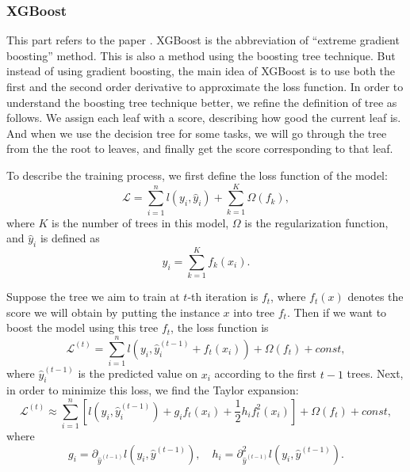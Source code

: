 \documentclass[english]{article}
\begin{document}
\subsubsection{XGBoost}
\par This part refers to the paper \cite{chen1603xgboost}. XGBoost is the abbreviation of ``extreme gradient boosting'' method. This is also a method using the boosting tree technique. But instead of using gradient boosting, the main idea of XGBoost is to use both the first and the second order derivative to approximate the loss function. In order to understand the boosting tree technique better, we refine the definition of tree as follows. We assign each leaf with a score, describing how good the current leaf is. And when we use the decision tree for some tasks, we will go through the tree from the the root to leaves, and finally get the score corresponding to that leaf.
\par To describe the training process, we first define the loss function of the model:
\begin{equation}
	\mathcal{L} = \sum_{i=1}^{n}l(y_{i}, \hat{y}_{i}) + \sum_{k=1}^{K}\Omega(f_{k}),
\end{equation}
where $K$ is the number of trees in this model, $\Omega$ is the regularization function, and $\hat{y}_{i}$ is defined as
\begin{equation}
	\hat{y}_{i} = \sum_{k=1}^{K}f_{k}(x_{i}).
\end{equation}
\par Suppose the tree we aim to train at $t$-th iteration is $f_{t}$, where $f_{t}(x)$ denotes the score we will obtain by putting the instance $x$ into tree $f_{t}$. Then if we want to boost the model using this tree $f_{t}$, the loss function is 
\begin{equation}
	\mathcal{L}^{(t)} = \sum_{i=1}^{n}l(y_{i}, \hat{y}_{i}^{(t-1)} + f_{t}(x_{i})) + \Omega(f_{t}) + const,
\end{equation}
where $\hat{y}_{i}^{(t-1)}$ is the predicted value on $x_{i}$ according to the first $t-1$ trees. Next, in order to minimize this loss, we find the Taylor expansion:
\begin{equation}\label{xgboost}
	\mathcal{L}^{(t)}\approx\sum_{i=1}^{n}\left[l(y_{i}, \hat{y}_{i}^{(t-1)}) + g_{i}f_{t}(x_{i}) + \frac{1}{2}h_{i}f_{t}^{2}(x_{i})\right] + \Omega(f_{t}) + const,
\end{equation}
where
\begin{equation}
	g_{i} = \partial_{\hat{y}^{(t-1)}}l(y_{i}, \hat{y}^{(t-1)}), \quad h_{i} = \partial^{2}_{\hat{y}^{(t-1)}}l(y_{i}, \hat{y}^{(t-1)}).
\end{equation}
\end{document}
